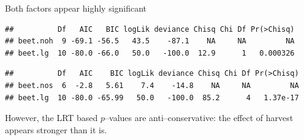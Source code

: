 \documentclass[
  ignorenonframetext,
]{beamer}
\newenvironment{Shaded}{\begin{snugshade}}{\end{snugshade}}
\newcommand{\KeywordTok}[1]{\textcolor[rgb]{0.13,0.29,0.53}{\textbf{#1}}}
\newcommand{\NormalTok}[1]{#1}
\newcommand{\OperatorTok}[1]{\textcolor[rgb]{0.81,0.36,0.00}{\textbf{#1}}}
\newcommand{\StringTok}[1]{\textcolor[rgb]{0.31,0.60,0.02}{#1}}
\begin{document}
\begin{frame}[fragile]

Both factors appear highly significant

\footnotesize

\begin{Shaded}
\end{Shaded}

\begin{verbatim}
##          Df   AIC   BIC logLik deviance Chisq Chi Df Pr(>Chisq)
## beet.noh  9 -69.1 -56.5   43.5    -87.1    NA     NA         NA
## beet.lg  10 -80.0 -66.0   50.0   -100.0  12.9      1   0.000326
\end{verbatim}

\begin{Shaded}
\end{Shaded}

\begin{verbatim}
##          Df   AIC    BIC logLik deviance Chisq Chi Df Pr(>Chisq)
## beet.nos  6  -2.8   5.61    7.4    -14.8    NA     NA         NA
## beet.lg  10 -80.0 -65.99   50.0   -100.0  85.2      4   1.37e-17
\end{verbatim}

\normalsize

However, the LRT based \(p\)--values are anti--conservative: the effect
of harvest appears stronger than it is.

\end{frame}
\end{document}
